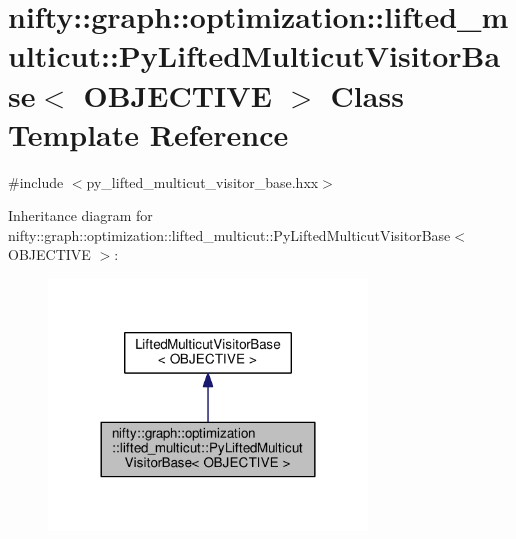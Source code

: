 \hypertarget{classnifty_1_1graph_1_1optimization_1_1lifted__multicut_1_1PyLiftedMulticutVisitorBase}{}\section{nifty\+:\+:graph\+:\+:optimization\+:\+:lifted\+\_\+multicut\+:\+:Py\+Lifted\+Multicut\+Visitor\+Base$<$ O\+B\+J\+E\+C\+T\+I\+V\+E $>$ Class Template Reference}
\label{classnifty_1_1graph_1_1optimization_1_1lifted__multicut_1_1PyLiftedMulticutVisitorBase}


{\ttfamily \#include $<$py\+\_\+lifted\+\_\+multicut\+\_\+visitor\+\_\+base.\+hxx$>$}



Inheritance diagram for nifty\+:\+:graph\+:\+:optimization\+:\+:lifted\+\_\+multicut\+:\+:Py\+Lifted\+Multicut\+Visitor\+Base$<$ O\+B\+J\+E\+C\+T\+I\+V\+E $>$\+:\nopagebreak
\begin{figure}[H]
\begin{center}
\leavevmode
\includegraphics[width=240pt]{classnifty_1_1graph_1_1optimization_1_1lifted__multicut_1_1PyLiftedMulticutVisitorBase__inherit__graph}
\end{center}
\end{figure}


